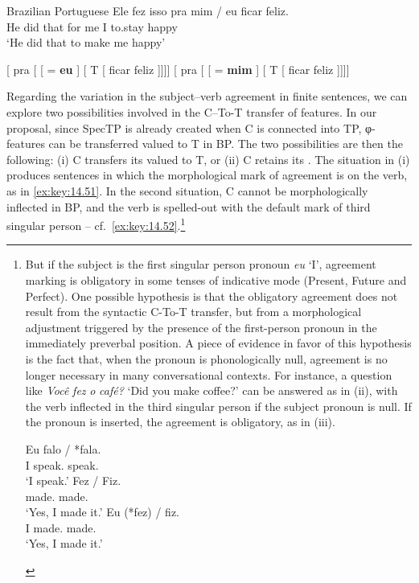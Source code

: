 \documentclass[output=paper]{langsci/langscibook}
\begin{document}
\ea%
    \label{ex:key:14.49}Brazilian Portuguese
    \sn
    \gll    Ele fez isso pra mim / eu ficar feliz.\\
            He did that for me {} I to.stay happy\\
    \glt    ‘He did that to make me happy’
\z

\ea%
    \label{ex:key:14.50}
	\ea
    {}[ pra [ [ \Fsg{} = \textbf{eu} ]
        [ T [ ficar feliz ]]]]
    \ex
    {}[ pra [ [ \Fsg{} = \textbf{mim} ]
        [ T [ ficar feliz ]]]]
    \z
\z

Regarding the variation in the subject--verb agreement in finite sentences, we
can explore two possibilities involved in the C--To-T transfer of features. In
our proposal, since SpecTP is already created when C is connected into TP,
φ-features can be transferred valued to T in BP. The two possibilities are
then the following: (i) C transfers its valued  to T, or (ii) C
retains its . The situation in (i) produces sentences in which the
morphological mark of agreement is on the verb, as in \eqref{ex:key:14.51}. In
the second situation, C cannot be morphologically inflected in BP, and the
verb is spelled-out with the default mark of third singular person -- cf.\
\eqref{ex:key:14.52}.\footnote{But if the subject is the first singular person
    pronoun \emph{eu} ‘I’, agreement marking is obligatory in some tenses of
    indicative mode (Present, Future and Perfect). One possible hypothesis is
    that the obligatory agreement does not result from the syntactic C-To-T
    transfer, but from a morphological adjustment triggered by the presence of
    the first-person pronoun in the immediately preverbal position. A piece of
    evidence in favor of this hypothesis is the fact that, when the pronoun is
    phonologically null, agreement is no longer necessary in many
    conversational contexts.  For instance, a question like \emph{Você}
    \emph{fez} \emph{o} \emph{café?} ‘Did you make coffee?’ can be answered as
    in (ii), with the verb inflected in the third singular person if the subject
    pronoun is null. If the pronoun is inserted, the agreement is obligatory,
    as in (iii).

    \begin{exe}
        \gll    Eu falo / *fala.\\
                I speak.\Fsg{} {} \hphantom{*}speak.\Tsg{}\\
        \glt    ‘I speak.’
        \gll    Fez / Fiz.\\
                made.\Tsg{} {} made.\Fsg{}\\
        \glt    ‘Yes, I made it.’
        \gll    Eu (*fez) / fiz.\\
                I \hphantom{(*}made.\Tsg{} {} made.\Fsg{}\\
        \glt    ‘Yes, I made it.’
    \end{exe}}
\end{document}
